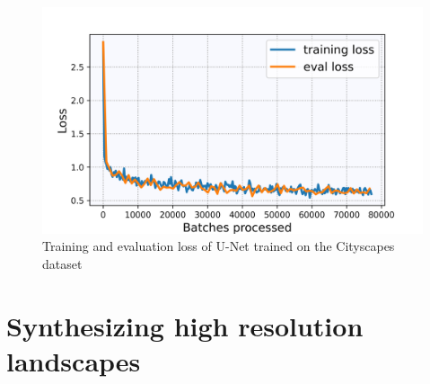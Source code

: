 %
\begin{figure}[] \label{fig:3.2}
    \centering
    \includegraphics[width=.65\textwidth]{Chapters/figures/experiments/cityscapes/loss_cityscapes_seg.jpg}
    \caption[Short-form caption]{Training and evaluation loss of U-Net trained on the Cityscapes dataset}
\end{figure}
%

\section{Synthesizing high resolution landscapes} \label{sec:5.5}


